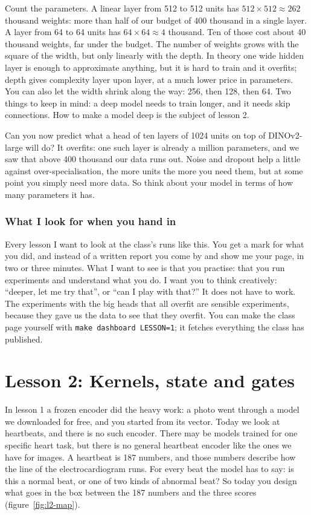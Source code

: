 \documentclass[12pt, a4paper]{article}
\theoremstyle{definition}
\theoremstyle{remark}
\begin{document}
Count the parameters. A linear layer from 512 to 512 units has $512 \times 512 \approx 262$ thousand weights: more than half of our budget of 400 thousand in a single layer. A layer from 64 to 64 units has $64 \times 64 \approx 4$ thousand. Ten of those cost about 40 thousand weights, far under the budget. The number of weights grows with the square of the width, but only linearly with the depth. In theory one wide hidden layer is enough to approximate anything, but it is hard to train and it overfits; depth gives complexity layer upon layer, at a much lower price in parameters. You can also let the width shrink along the way: 256, then 128, then 64. Two things to keep in mind: a deep model needs to train longer, and it needs skip connections. How to make a model deep is the subject of lesson 2.

Can you now predict what a head of ten layers of 1024 units on top of DINOv2-large will do? It overfits: one such layer is already a million parameters, and we saw that above 400 thousand our data runs out. Noise and dropout help a little against over-specialisation, the more units the more you need them, but at some point you simply need more data. So think about your model in terms of how many parameters it has.

\subsubsection{What I look for when you hand in}
Every lesson I want to look at the class's runs like this. You get a mark for what you did, and instead of a written report you come by and show me your page, in two or three minutes. What I want to see is that you practise: that you run experiments and understand what you do. I want you to think creatively: ``deeper, let me try that'', or ``can I play with that?'' It does not have to work. The experiments with the big heads that all overfit are sensible experiments, because they gave us the data to see that they overfit. You can make the class page yourself with \texttt{make dashboard LESSON=1}; it fetches everything the class has published.
\newpage

\section{Lesson 2: Kernels, state and gates}
\label{sec:lesson2}
In lesson 1 a frozen encoder did the heavy work: a photo went through a model we downloaded for free, and you started from its vector. Today we look at heartbeats, and there is no such encoder. There may be models trained for one specific heart task, but there is no general heartbeat encoder like the ones we have for images. A heartbeat is 187 numbers, and those numbers describe how the line of the electrocardiogram runs. For every beat the model has to say: is this a normal beat, or one of two kinds of abnormal beat? So today you design what goes in the box between the 187 numbers and the three scores (figure~\ref{fig:l2-map}).
\end{document}
